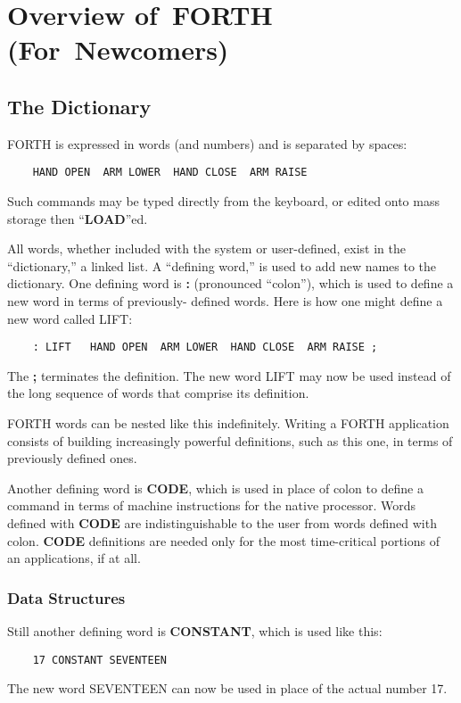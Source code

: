 \appendix{}
\chapter{Overview
of~FORTH
(For~Newcomers)}
\section{The Dictionary}
FORTH is expressed in words (and numbers) and is separated by spaces:
\begin{verbatim}
    HAND OPEN  ARM LOWER  HAND CLOSE  ARM RAISE 
\end{verbatim}
Such commands may be typed directly from the keyboard, or edited onto 
mass storage then ``{\bf LOAD}''ed.

All words, whether included with the system or user-defined,
exist in the ``dictionary,'' a linked list.  A ``defining word,'' is used to add
new names to the dictionary.  One defining word is {\bf :} (pronounced
``colon''), which is used to define a new word in terms of previously-
defined words.  Here is how one might define a new word called LIFT:
\begin{verbatim}
    : LIFT   HAND OPEN  ARM LOWER  HAND CLOSE  ARM RAISE ;
\end{verbatim}
The {\bf ;} terminates the definition.  The new word LIFT may now be used
instead of the long sequence of words that comprise its definition.

FORTH words can be nested like this indefinitely.  Writing a 
FORTH application consists of building increasingly powerful definitions,
such as this one, in terms of previously defined ones.

Another defining word is {\bf CODE}, which is used in place of colon to
define a command in terms of machine instructions for the native processor.
Words defined with {\bf CODE} are indistinguishable to the user from 
words defined with colon.  {\bf CODE} definitions are needed only for the most
time-critical portions of an applications, if at all.
\subsection{Data Structures}
Still another defining word is {\bf CONSTANT}, which
is used like this:
\begin{verbatim}
    17 CONSTANT SEVENTEEN
\end{verbatim}
The new word SEVENTEEN can now be used in place of the actual number 17.

